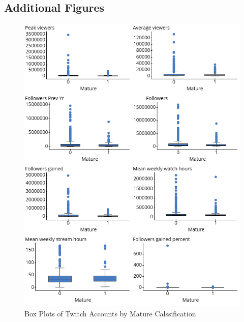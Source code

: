 \documentclass[12pt]{article}
\begin{document}
\subsection{Additional Figures}

\begin{figure}[H]
  \centering %
  \includegraphics[width=0.8\linewidth]{../StatCrunch_Results/mature/box_plots}
  \captionsetup{justification=centering, singlelinecheck=false, margin=2cm}
  \caption[Box Plots of Twitch Accounts by Mature Calssification]{Box Plots of Twitch Accounts by Mature Calssification}
  \label{fig:box_plots_mature}
\end{figure}
\end{document}
